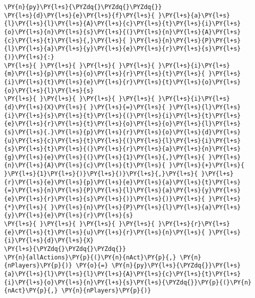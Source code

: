 \documentclass[main.tex]{subfiles}
\begin{document}
    \begin{tcolorbox}[breakable, size=fbox, boxrule=1pt, pad at break*=1mm,colback=cellbackground, colframe=cellborder]
\begin{Verbatim}[commandchars=\\\{\}]
\PY{n}{py}\PY{l+s}{\PYZdq{}\PYZdq{}\PYZdq{}}
\PY{l+s}{d}\PY{l+s}{e}\PY{l+s}{f}\PY{l+s}{ }\PY{l+s}{a}\PY{l+s}{l}\PY{l+s}{l}\PY{l+s}{A}\PY{l+s}{c}\PY{l+s}{t}\PY{l+s}{i}\PY{l+s}{o}\PY{l+s}{n}\PY{l+s}{s}\PY{l+s}{(}\PY{l+s}{n}\PY{l+s}{A}\PY{l+s}{c}\PY{l+s}{t}\PY{l+s}{,}\PY{l+s}{ }\PY{l+s}{n}\PY{l+s}{P}\PY{l+s}{l}\PY{l+s}{a}\PY{l+s}{y}\PY{l+s}{e}\PY{l+s}{r}\PY{l+s}{s}\PY{l+s}{)}\PY{l+s}{:}
\PY{l+s}{ }\PY{l+s}{ }\PY{l+s}{ }\PY{l+s}{ }\PY{l+s}{i}\PY{l+s}{m}\PY{l+s}{p}\PY{l+s}{o}\PY{l+s}{r}\PY{l+s}{t}\PY{l+s}{ }\PY{l+s}{i}\PY{l+s}{t}\PY{l+s}{e}\PY{l+s}{r}\PY{l+s}{t}\PY{l+s}{o}\PY{l+s}{o}\PY{l+s}{l}\PY{l+s}{s}
\PY{l+s}{ }\PY{l+s}{ }\PY{l+s}{ }\PY{l+s}{ }\PY{l+s}{i}\PY{l+s}{d}\PY{l+s}{X}\PY{l+s}{ }\PY{l+s}{=}\PY{l+s}{ }\PY{l+s}{l}\PY{l+s}{i}\PY{l+s}{s}\PY{l+s}{t}\PY{l+s}{(}\PY{l+s}{i}\PY{l+s}{t}\PY{l+s}{e}\PY{l+s}{r}\PY{l+s}{t}\PY{l+s}{o}\PY{l+s}{o}\PY{l+s}{l}\PY{l+s}{s}\PY{l+s}{.}\PY{l+s}{p}\PY{l+s}{r}\PY{l+s}{o}\PY{l+s}{d}\PY{l+s}{u}\PY{l+s}{c}\PY{l+s}{t}\PY{l+s}{(}\PY{l+s}{l}\PY{l+s}{i}\PY{l+s}{s}\PY{l+s}{t}\PY{l+s}{(}\PY{l+s}{r}\PY{l+s}{a}\PY{l+s}{n}\PY{l+s}{g}\PY{l+s}{e}\PY{l+s}{(}\PY{l+s}{1}\PY{l+s}{,}\PY{l+s}{ }\PY{l+s}{n}\PY{l+s}{A}\PY{l+s}{c}\PY{l+s}{t}\PY{l+s}{ }\PY{l+s}{+}\PY{l+s}{ }\PY{l+s}{1}\PY{l+s}{)}\PY{l+s}{)}\PY{l+s}{,}\PY{l+s}{ }\PY{l+s}{r}\PY{l+s}{e}\PY{l+s}{p}\PY{l+s}{e}\PY{l+s}{a}\PY{l+s}{t}\PY{l+s}{=}\PY{l+s}{n}\PY{l+s}{P}\PY{l+s}{l}\PY{l+s}{a}\PY{l+s}{y}\PY{l+s}{e}\PY{l+s}{r}\PY{l+s}{s}\PY{l+s}{)}\PY{l+s}{)}\PY{l+s}{ }\PY{l+s}{*}\PY{l+s}{ }\PY{l+s}{n}\PY{l+s}{P}\PY{l+s}{l}\PY{l+s}{a}\PY{l+s}{y}\PY{l+s}{e}\PY{l+s}{r}\PY{l+s}{s}
\PY{l+s}{ }\PY{l+s}{ }\PY{l+s}{ }\PY{l+s}{ }\PY{l+s}{r}\PY{l+s}{e}\PY{l+s}{t}\PY{l+s}{u}\PY{l+s}{r}\PY{l+s}{n}\PY{l+s}{ }\PY{l+s}{i}\PY{l+s}{d}\PY{l+s}{X}
\PY{l+s}{\PYZdq{}\PYZdq{}\PYZdq{}}
\PY{n}{allActions}\PY{p}{(}\PY{n}{nAct}\PY{p}{,} \PY{n}{nPlayers}\PY{p}{)} \PY{o}{=} \PY{n}{py}\PY{l+s}{\PYZdq{}}\PY{l+s}{a}\PY{l+s}{l}\PY{l+s}{l}\PY{l+s}{A}\PY{l+s}{c}\PY{l+s}{t}\PY{l+s}{i}\PY{l+s}{o}\PY{l+s}{n}\PY{l+s}{s}\PY{l+s}{\PYZdq{}}\PY{p}{(}\PY{n}{nAct}\PY{p}{,} \PY{n}{nPlayers}\PY{p}{)}
\end{Verbatim}
\end{tcolorbox}
\end{document}
